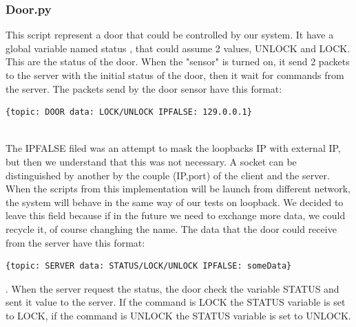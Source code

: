 \subsubsection{Door.py}
This script represent a door that could be controlled by our system. It have a global variable named status , that could assume 2 values, UNLOCK and LOCK.
This are the status of the door. When the "sensor" is turned on,  it send 2 packets to the server with the initial status of the door, then it wait for commands from the server.  The packets send by the door sensor have this format: \begin{verbatim}{topic: DOOR data: LOCK/UNLOCK IPFALSE: 129.0.0.1}\end{verbatim} \\ The IPFALSE filed was an attempt
to mask the loopbacks IP with external IP, but then we understand that this was not necessary. A socket can be distinguished by another by the couple (IP,port) 
of the client and the server. When the scripts from this implementation will be launch from different network, the system will behave in the same way of  our tests on loopback. We decided to leave this field because if in the future we need to exchange more data, we could recycle it, of course changhing the name.
The data that the door could receive from the server have this format: \begin{verbatim}{topic: SERVER data: STATUS/LOCK/UNLOCK IPFALSE: someData}\end{verbatim}. When the server 
request the status, the door check the variable STATUS and sent it value to the server.  If the command is LOCK the STATUS variable is set to LOCK, if the command is UNLOCK the STATUS variable is set to UNLOCK.


